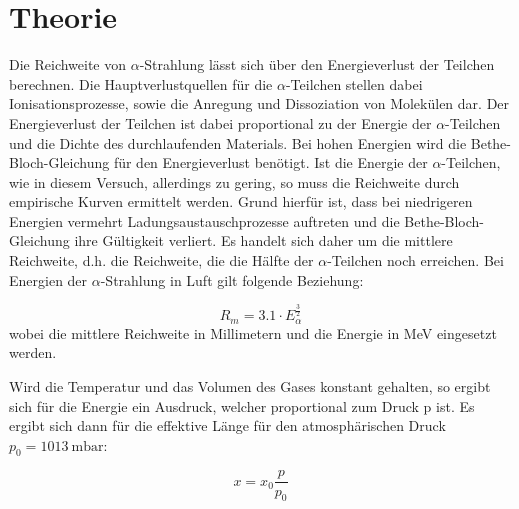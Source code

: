 \section{Theorie}
\label{sec:Theorie}

Die Reichweite von $\alpha$-Strahlung lässt sich über den Energieverlust der Teilchen berechnen.
Die Hauptverlustquellen für die $\alpha$-Teilchen stellen dabei Ionisationsprozesse, sowie die Anregung und Dissoziation von Molekülen dar.
Der Energieverlust der Teilchen ist dabei proportional zu der Energie der $\alpha$-Teilchen und die Dichte des durchlaufenden Materials.
Bei hohen Energien wird die Bethe-Bloch-Gleichung für den Energieverlust benötigt.
Ist die Energie der $\alpha$-Teilchen, wie in diesem Versuch, allerdings zu gering, so muss die Reichweite durch empirische Kurven ermittelt werden.
Grund hierfür ist, dass bei niedrigeren Energien vermehrt Ladungsaustauschprozesse auftreten und die Bethe-Bloch-Gleichung ihre Gültigkeit verliert.
Es handelt sich daher um die mittlere Reichweite, d.h. die Reichweite, die die Hälfte der $\alpha$-Teilchen noch erreichen.
Bei Energien der $\alpha$-Strahlung in Luft gilt folgende Beziehung:

\begin{equation}
  R_m = 3.1 \cdot E_{\alpha}^{\frac{3}{2}}
  \label{eqn:rm}
\end{equation}
wobei die mittlere Reichweite in Millimetern und die Energie in MeV eingesetzt werden.

Wird die Temperatur und das Volumen des Gases konstant gehalten, so ergibt sich für die Energie ein Ausdruck, welcher proportional zum Druck p ist.
Es ergibt sich dann für die effektive Länge für den atmosphärischen Druck $p_0 = \SI{1013}{\milli\bar}$:

\begin{equation}
  x = x_0 \frac{p}{p_0}
  \label{eqn:xeff}
\end{equation}
